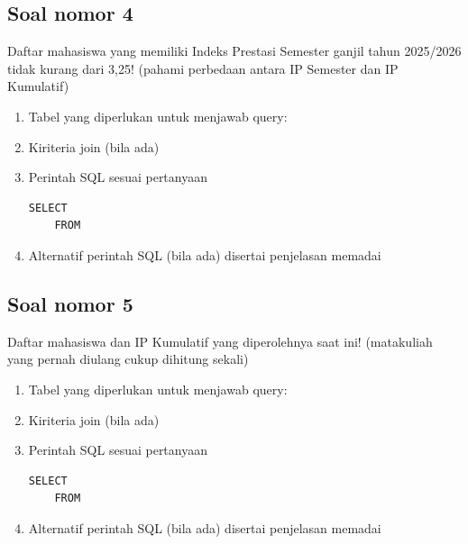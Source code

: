 \subsection{Soal nomor 4}
\begin{tcolorbox}
Daftar mahasiswa yang memiliki Indeks Prestasi Semester ganjil tahun 2025/2026 tidak kurang dari 3,25! (pahami perbedaan antara IP Semester dan IP Kumulatif)
\end{tcolorbox}
\begin{enumerate}
    \itemsep0em
    \item Tabel yang diperlukan untuk menjawab query:
    \item Kiriteria join (bila ada)
    \item Perintah SQL sesuai pertanyaan
    \begin{lstlisting}
SELECT 
    FROM
    \end{lstlisting}
    \item Alternatif perintah SQL (bila ada) disertai penjelasan memadai
\end{enumerate}

\subsection{Soal nomor 5}
\begin{tcolorbox}
    Daftar mahasiswa dan IP Kumulatif yang diperolehnya saat ini! (matakuliah yang pernah diulang cukup dihitung sekali) 
\end{tcolorbox}
\begin{enumerate}
    \itemsep0em
    \item Tabel yang diperlukan untuk menjawab query:
    \item Kiriteria join (bila ada)
    \item Perintah SQL sesuai pertanyaan
    \begin{lstlisting}
SELECT 
    FROM
    \end{lstlisting}
    \item Alternatif perintah SQL (bila ada) disertai penjelasan memadai
\end{enumerate}
